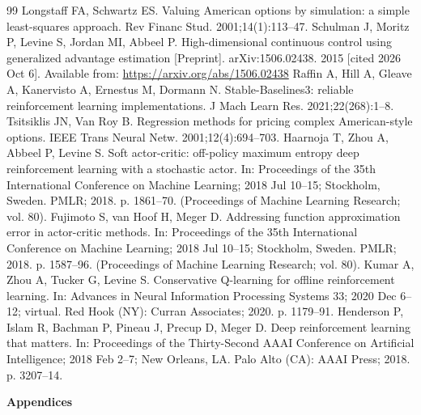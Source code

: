 \documentclass[12pt,a4paper]{article}
\begin{document}
\begin{thebibliography}{99}
 Longstaff FA, Schwartz ES. Valuing American options by simulation: a simple
least-squares approach. Rev Financ Stud. 2001;14(1):113--47.
 Schulman J, Moritz P, Levine S, Jordan MI, Abbeel P. High-dimensional continuous
control using generalized advantage estimation [Preprint]. arXiv:1506.02438. 2015 [cited 2026
Oct 6]. Available from: \url{https://arxiv.org/abs/1506.02438}
 Raffin A, Hill A, Gleave A, Kanervisto A, Ernestus M, Dormann N.
Stable-Baselines3: reliable reinforcement learning implementations. J Mach Learn Res.
2021;22(268):1--8.
 Tsitsiklis JN, Van Roy B. Regression methods for pricing complex American-style
options. IEEE Trans Neural Netw. 2001;12(4):694--703.
 Haarnoja T, Zhou A, Abbeel P, Levine S. Soft actor-critic: off-policy maximum
entropy deep reinforcement learning with a stochastic actor. In: Proceedings of the 35th
International Conference on Machine Learning; 2018 Jul 10--15; Stockholm, Sweden. PMLR;
2018. p. 1861--70. (Proceedings of Machine Learning Research; vol. 80).
 Fujimoto S, van Hoof H, Meger D. Addressing function approximation error in
actor-critic methods. In: Proceedings of the 35th International Conference on Machine
Learning; 2018 Jul 10--15; Stockholm, Sweden. PMLR; 2018. p. 1587--96. (Proceedings of
Machine Learning Research; vol. 80).
 Kumar A, Zhou A, Tucker G, Levine S. Conservative Q-learning for offline
reinforcement learning. In: Advances in Neural Information Processing Systems 33; 2020 Dec
6--12; virtual. Red Hook (NY): Curran Associates; 2020. p. 1179--91.
 Henderson P, Islam R, Bachman P, Pineau J, Precup D, Meger D. Deep
reinforcement learning that matters. In: Proceedings of the Thirty-Second AAAI Conference on
Artificial Intelligence; 2018 Feb 2--7; New Orleans, LA. Palo Alto (CA): AAAI Press; 2018.
p. 3207--14.
\end{thebibliography}

\clearpage
\appendix
\renewcommand{\thesection}{\Alph{section}}
\begin{center}{\Large\bfseries Appendices}\end{center}
\end{document}
